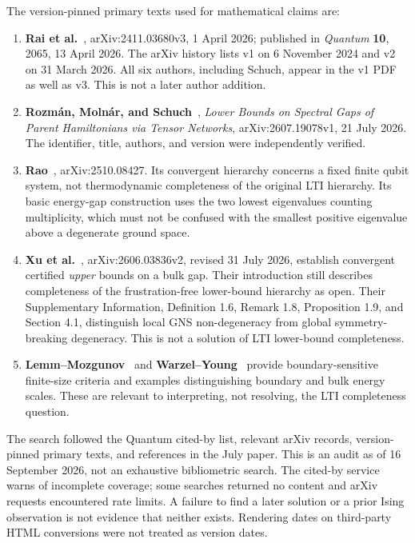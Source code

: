 \documentclass{article}
\begin{document}
The version-pinned primary texts used for mathematical claims are:
\begin{enumerate}
  \item \textbf{Rai et al.}~\cite{LTI}, arXiv:2411.03680v3,
  1 April 2026; published in \emph{Quantum} \textbf{10}, 2065,
  13 April 2026. The arXiv history lists v1 on 6 November 2024 and v2
  on 31 March 2026. All six authors, including Schuch, appear in the v1
  PDF as well as v3. This is not a later author addition.
  \item \textbf{Rozm\'an, Moln\'ar, and Schuch}~\cite{RMS},
  \emph{Lower Bounds on Spectral Gaps of Parent Hamiltonians via Tensor
  Networks}, arXiv:2607.19078v1, 21 July 2026. The identifier, title,
  authors, and version were independently verified.
  \item \textbf{Rao}~\cite{Rao}, arXiv:2510.08427. Its convergent
  hierarchy concerns a fixed finite qubit system, not thermodynamic
  completeness of the original LTI hierarchy. Its basic energy-gap
  construction uses the two lowest eigenvalues counting multiplicity,
  which must not be confused with the smallest positive eigenvalue
  above a degenerate ground space.
  \item \textbf{Xu et al.}~\cite{Xu}, arXiv:2606.03836v2,
  revised 31 July 2026, establish convergent certified \emph{upper}
  bounds on a bulk gap. Their introduction still describes completeness
  of the frustration-free lower-bound hierarchy as open. Their
  Supplementary Information, Definition 1.6, Remark 1.8, Proposition 1.9,
  and Section 4.1, distinguish local GNS non-degeneracy from global
  symmetry-breaking degeneracy. This is not a solution of LTI
  lower-bound completeness.
  \item \textbf{Lemm--Mozgunov}~\cite{LM} and
  \textbf{Warzel--Young}~\cite{WY} provide boundary-sensitive
  finite-size criteria and examples distinguishing boundary and bulk
  energy scales. These are relevant to interpreting, not resolving,
  the LTI completeness question.
\end{enumerate}

The search followed the Quantum cited-by list, relevant arXiv records,
version-pinned primary texts, and references in the July paper. This is
an audit as of 16 September 2026, not an exhaustive bibliometric search.
The cited-by service warns of incomplete coverage; some searches returned
no content and arXiv requests encountered rate limits. A failure to find a
later solution or a prior Ising observation is not evidence that neither
exists. Rendering dates on third-party HTML conversions were not treated
as version dates.
\end{document}
